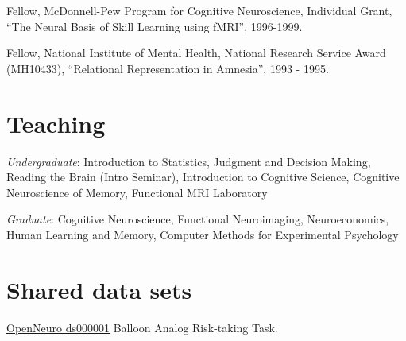 \documentclass[10pt, letterpaper]{article}
\begin{document}
Fellow, McDonnell-Pew Program for Cognitive Neuroscience, Individual Grant, ``The Neural Basis of Skill Learning using fMRI'', 1996-1999.\vspace{2mm}
      
Fellow, National Institute of Mental Health, National Research Service Award (MH10433), ``Relational Representation in Amnesia'', 1993 - 1995.

\section*{Teaching}

%
%
%
%
%      
%
%      
%
\textit{Undergraduate}: Introduction to Statistics, Judgment and Decision Making, Reading the Brain (Intro Seminar), Introduction to Cognitive Science, Cognitive Neuroscience of Memory, Functional MRI Laboratory\vspace{2mm}

\textit{Graduate}: Cognitive Neuroscience, Functional Neuroimaging, Neuroeconomics, Human Learning and Memory, Computer Methods for Experimental Psychology\vspace{2mm}

\section*{Shared data sets}

\href{https://openneuro.org/datasets/ds000001}{OpenNeuro ds000001} Balloon Analog Risk-taking Task.   \vspace{2mm}
\end{document}
